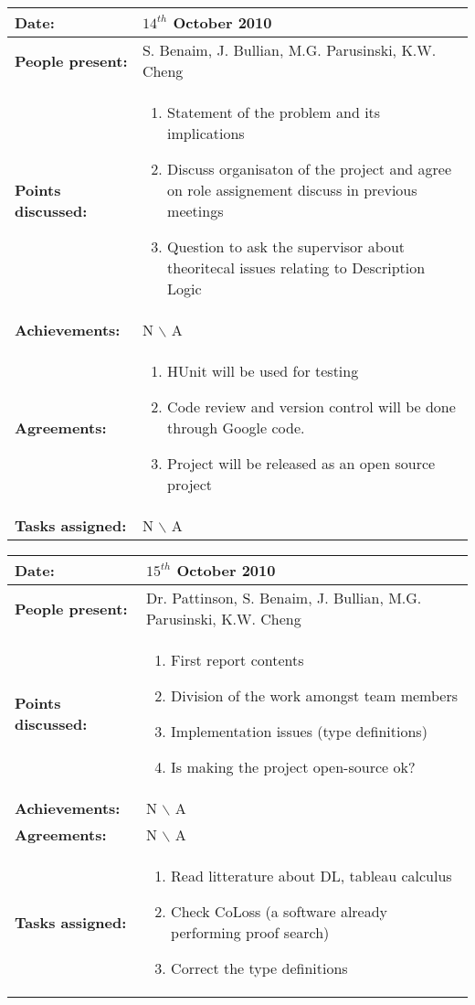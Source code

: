 \documentclass[12pt,a4paper]{article}
\newcommand{\meeting}[6]{%
\begin{center}%
\begin{longtable}{| p{3.5cm} | | p{13cm} |}%
\hline%
\textbf{Date:} & #1 \\%
\hline%
\textbf{People present:} &#2 \\%
\hline%
\textbf{Points discussed:} &#3\\%
\hline%
\textbf{Achievements:} &#4 \\%
\hline%
\textbf{Agreements:} &#5 \\%
\hline%
\textbf{Tasks assigned:} &#6  \\%
\hline%
\end{longtable}%
\end{center}%
\bigbreak
}
\begin{document}
\meeting{$14^{th}$ October 2010}%
{S. Benaim, J. Bullian, M.G. Parusinski, K.W. Cheng}%
{ \begin{enumerate} \item Statement of the problem and its implications 
 \item Discuss organisaton of the project and agree on role assignement discuss in 
previous meetings
\item Question to ask the supervisor about theoritecal issues relating to Description Logic
\end{enumerate} }%
{ N $\backslash$ A}%
{ \begin{enumerate}
\item HUnit will be used for testing
\item Code review and version control will be done through Google code. 
\item Project will be released as an open source project
\end{enumerate}}%
{N $\backslash$ A}

\meeting{$15^{th}$ October 2010}%
{Dr. Pattinson, S. Benaim, J. Bullian, M.G. Parusinski, K.W. Cheng}%
{ \begin{enumerate} \item First report contents
\item Division of the work amongst team members
\item Implementation issues (type definitions)
\item Is making the project open-source ok?
\end{enumerate} }%
{ N $\backslash$ A}%
{N $\backslash$ A}
{ \begin{enumerate}
\item Read litterature about DL, tableau calculus
\item Check CoLoss (a software already performing proof search)
\item Correct the type definitions 
\end{enumerate}}%
\end{document}
